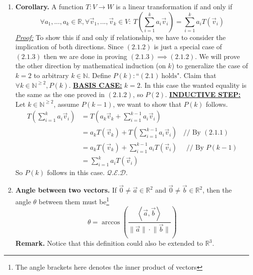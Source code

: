 \documentclass[oneside, 12pt]{book}
\newcommand{\settag}[1]{\renewcommand{\theenumi}{#1}}
\newcommand{\R}{\mathbb{R}}
\newcommand{\double}[1]{\mathbb{#1}} %
\newcommand{\qed}{\hfill $\mathcal{Q}.\mathcal{E}.\mathcal{D}.$}
\newcommand{\tbf}[1]{\textbf{#1}}
\newcommand{\tit}[1]{\textit{#1}}
\begin{document}
\begin{enumerate}
        \settag{2.1.3}
        \item \tbf{Corollary.} A function $T:V\xrightarrow{}W$ is a linear transformation if and only if
        \begin{equation}
            \forall a_1,...,a_k\in \R, \forall \vec{v}_1, ...,\vec{v}_k\in V:~ 
            T\left(\sum_{i=1}^{k}a_i\vec{v}_i\right) = \sum_{i=1}^{k}a_i T\left(\vec{v}_i\right)
        \end{equation}
        \tit{\underline{Proof:}} To show this if and only if relationship, we have to consider the implication of both directions. Since $(2.1.2)$ is just a special case of $(2.1.3)$ then we are done in proving $(2.1.3)\implies (2.1.2)$. We will prove the other direction by mathematical induction (on $k$) to generalize the case of $k=2$ to arbitrary $k\in \double{N}$. \newline
        Define $P(k): \text{``}(2.1)~\text{holds"}$. \newline
        Claim that $\forall k \in \double{N}^{\geq 2}, P(k)$.\newline
        \tbf{\underline{BASIS CASE:}} $k = 2$. In this case the wanted equality is the same as the one proved in $(2.1.2)$, so $P(2)$. \newline
        \tbf{\underline{INDUCTIVE STEP:}} Let $k\in \double{N}^{\geq 2}$, assume $P(k-1)$, we want to show that $P(k)$ follows.\newline
        \begin{align*}
            T\left(\sum_{i=1}^{k}a_i\vec{v}_i\right) &= T\left(a_k\vec{v}_k + \sum_{i=1}^{k-1}a_i\vec{v}_i\right) \\
            &= a_k T(\vec{v}_k) + T\left(\sum_{i=1}^{k-1}a_i\vec{v}_i\right)~~~~\text{// By $(2.1.1)$} \\
            &= a_k T(\vec{v}_k) + \sum_{i=1}^{k-1}a_i T\left(\vec{v}_i\right)~~~~~~\text{// By $P(k-1)$}\\
            &= \sum_{i=1}^{k}a_i T\left(\vec{v}_i\right)
        \end{align*}
        So $P(k)$ follows in this case.
        \qed
        
        \settag{2.1.9}
        \item \tbf{Angle between two vectors.} If $\vec{0}\neq \vec{a}\in \R^2$ and $\vec{0}\neq \vec{b}\in \R^2$, then the angle $\theta$ between them must be\footnote{The angle brackets here denotes the inner product of vectors}
        \begin{equation*}
            \theta = \arccos\left( \frac{\left<\vec{a},\vec{b}\right>}{\lVert\vec{a}\rVert \cdot \lVert\vec{b}\rVert}\right)
        \end{equation*}
        \tbf{Remark.} Notice that this definition could also be extended to $\R^3$.
        

\end{enumerate}
\end{document}
